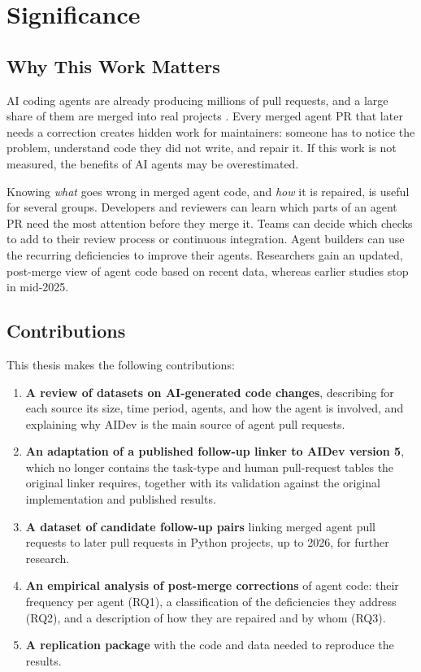 \section{Significance}
\label{sec:significance}

\subsection{Why This Work Matters}
\label{subsec:why-this-work-matters}

AI coding agents are already producing millions of pull requests, and a large
share of them are merged into real projects
\cite{aidev2026hf,watanabe2025agentic}. Every merged agent PR that later needs a
correction creates hidden work for maintainers: someone has to notice the
problem, understand code they did not write, and repair it. If this work is not
measured, the benefits of AI agents may be overestimated.

Knowing \emph{what} goes wrong in merged agent code, and \emph{how} it is
repaired, is useful for several groups. Developers and reviewers can learn which
parts of an agent PR need the most attention before they merge it. Teams can
decide which checks to add to their review process or continuous integration.
Agent builders can use the recurring deficiencies to improve their agents.
Researchers gain an updated, post-merge view of agent code based on recent data,
whereas earlier studies stop in mid-2025.

\subsection{Contributions}
\label{subsec:contributions}

This thesis makes the following contributions:

\begin{enumerate}
  \item \textbf{A review of datasets on AI-generated code changes}, describing
  for each source its size, time period, agents, and how the agent is involved,
  and explaining why AIDev is the main source of agent pull requests.
  \item \textbf{An adaptation of a published follow-up linker to AIDev version
  5}, which no longer contains the task-type and human pull-request tables the
  original linker requires, together with its validation against the original
  implementation and published results.
  \item \textbf{A dataset of candidate follow-up pairs} linking merged agent pull
  requests to later pull requests in Python projects, up to 2026, for further
  research.
  \item \textbf{An empirical analysis of post-merge corrections} of agent code:
  their frequency per agent (RQ1), a classification of the deficiencies they
  address (RQ2), and a description of how they are repaired and by whom (RQ3).
  \item \textbf{A replication package} with the code and data needed to reproduce
  the results.
\end{enumerate}

